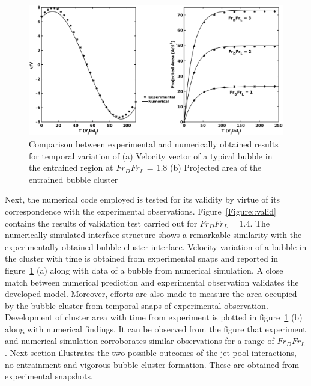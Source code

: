 \begin{figure}
	\centering
	\includegraphics[width=\linewidth]{chapters/jetPool/Figure7}
	\caption{Comparison between experimental and numerically obtained results for temporal variation of (a) Velocity vector of a typical bubble in the entrained region at $Fr_DFr_L$ = 1.8 (b) Projected area of the entrained bubble cluster }
	\label{Figure::valid2}
\end{figure}
Next, the numerical code employed is tested for its validity by virtue of its correspondence with the experimental observations. Figure~\ref{Figure::valid} contains the results of validation test carried out for $Fr_DFr_L = 1.4$. The numerically simulated interface structure shows a remarkable similarity with the experimentally obtained bubble cluster interface. Velocity variation of a bubble in the cluster with time is obtained from experimental snaps and reported in figure~\ref{Figure::valid2} (a) along with data of a bubble from numerical simulation. A close match between numerical prediction and experimental observation validates the developed model. Moreover, efforts are also made to measure the area occupied by the bubble cluster from temporal snaps of experimental observation. Development of cluster area with time from experiment is plotted in figure~\ref{Figure::valid2} (b) along with numerical findings. It can be observed from the figure that experiment and numerical simulation corroborates similar observations for a range of $Fr_DFr_L$.
Next section illustrates the two possible outcomes of the jet-pool interactions, no entrainment and vigorous bubble cluster formation. These are obtained from experimental snapshots. 

